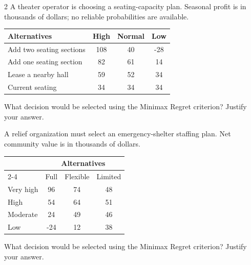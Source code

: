 \begin{multicols}{2}
		A theater operator is choosing a seating-capacity plan. Seasonal profit is in thousands of dollars; no reliable probabilities are available.\vspace{-3mm}
		\begin{center}\setlength{\tabcolsep}{2pt}\renewcommand{\arraystretch}{1.1}
			\begin{tabular}{lccc}\toprule
			Alternatives & High & Normal & Low\\ \midrule
			Add two seating sections&108&40&-28\\
			Add one seating section&82&61&14\\
			Lease a nearby hall&59&52&34\\
			Current seating&34&34&34\\ \bottomrule
			\end{tabular}
		\end{center}\vspace{-3mm}
		What decision would be selected using the Minimax Regret criterion? Justify your answer.
		
		\columnbreak

		A relief organization must select an emergency-shelter staffing plan. Net community value is in thousands of dollars.\vspace{-3mm}
		\begin{center}
			\setlength{\tabcolsep}{2pt}
			\renewcommand{\arraystretch}{1.1}
			\begin{tabular}{lccc}
				\toprule
				& \multicolumn{3}{c}{Alternatives} \\
				\cmidrule(lr){2-4}
				& Full & Flexible & Limited \\ \midrule
				Very high & 96 & 74 & 48 \\
				High      & 54 & 64 & 51 \\
				Moderate  & 24 & 49 & 46 \\
				Low       & -24 & 12 & 38 \\ \bottomrule
			\end{tabular}
		\end{center}\vspace{-3mm}
		What decision would be selected using the Minimax Regret criterion? Justify your answer.\vspace{-3mm}


\end{multicols}
